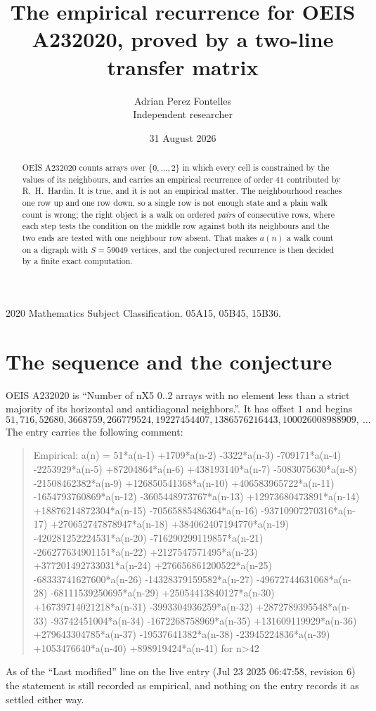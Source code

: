 \documentclass[11pt,a4paper]{article}
\title{The empirical recurrence for OEIS A232020, proved by a two-line transfer matrix}
\author{Adrian Perez Fontelles\\ \small Independent researcher}
\date{31 August 2026}
\theoremstyle{plain}
\theoremstyle{definition}
\begin{document}
\maketitle

\begin{abstract}
OEIS A232020 counts arrays over $\{0,\dots,2\}$ in which every cell is constrained by the
values of its neighbours, and carries an empirical recurrence of order $41$ contributed
by R.~H.~Hardin. It is true, and it is not an empirical matter. The neighbourhood reaches one
row up and one row down, so a single row is not enough state and a plain walk count
is wrong; the right object is a walk on ordered \emph{pairs} of consecutive rows, where
each step tests the condition on the middle row against both its neighbours and the two
ends are tested with one neighbour row absent. That makes $a(n)$ a walk count on a digraph
with $S=59049$ vertices, and the conjectured recurrence is then decided by a finite exact
computation.
\end{abstract}

\noindent\small 2020 Mathematics Subject Classification. 05A15, 05B45, 15B36.\normalsize

\section{The sequence and the conjecture}

OEIS A232020 is ``Number of nX5 0..2 arrays with no element less than a strict majority of its horizontal and antidiagonal neighbors.''. It has offset $1$ and begins
\[
51, 716, 52680, 3668759, 266779524, 19227454407, 1386576216443, 100026008988909,\ \dots
\]
The entry carries the following comment:
\begin{quote}\small
Empirical: a(n) = 51*a(n-1) +1709*a(n-2) -3322*a(n-3) -709171*a(n-4) -2253929*a(n-5) +87204864*a(n-6) +438193140*a(n-7) -5083075630*a(n-8) -21508462382*a(n-9) +126850541368*a(n-10) +406583965722*a(n-11) -1654793760869*a(n-12) -3605448973767*a(n-13) +12973680473891*a(n-14) +18876214872304*a(n-15) -70565885486364*a(n-16) -93710907270316*a(n-17) +270652747878947*a(n-18) +384062407194770*a(n-19) -420281252224531*a(n-20) -716290299119857*a(n-21) -266277634901151*a(n-22) +2127547571495*a(n-23) +377201492733031*a(n-24) +276656861200522*a(n-25) -68333741627600*a(n-26) -14328379159582*a(n-27) -49672744631068*a(n-28) -68111539250695*a(n-29) +25054413840127*a(n-30) +16739714021218*a(n-31) -3993304936259*a(n-32) +2872789395548*a(n-33) -93742451004*a(n-34) -1672268758969*a(n-35) +131609119929*a(n-36) +279643304785*a(n-37) -19537641382*a(n-38) -23945224836*a(n-39) +1053476640*a(n-40) +898919424*a(n-41) for n>42
\end{quote}
As of the ``Last modified'' line on the live entry (Jul 23 2025 06:47:58, revision 6) the statement is
still recorded as empirical, and nothing on the entry records it as settled either way.
\end{document}

